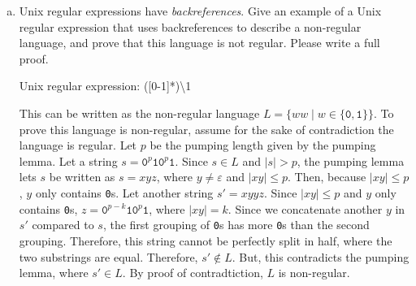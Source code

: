 \documentclass{article}
\begin{document}
\begin{enumerate}[(a)]
                Therefore, any regular expression with a quantifier can be rewritten without a quantifier.

            \item Unix regular expressions have \textit{backreferences}. Give an example of a Unix regular expression that uses backreferences to describe a non-regular language, and prove that this language is not regular. Please write a full proof.

                Unix regular expression: ([0-1]*)\textbackslash1

                This can be written as the non-regular language $L = \{ww \mid w \in \{\texttt{0}, \texttt{1}\}\}$. To prove this language is non-regular, assume for the sake of contradiction the language is regular. Let $p$ be the pumping length given by the pumping lemma. Let a string $s = \texttt{0}^p \texttt{10}^p \texttt{1}$. Since $s \in L$ and $|s| > p$, the pumping lemma lets $s$ be written as $s = xyz$, where $y \neq \varepsilon$ and $|xy| \le p$. Then, because $|xy| \le p$, $y$ only contains \texttt{0}s. Let another string $s' = xyyz$. Since $|xy| \le p$ and $y$ only contains \texttt{0}s, $z = \texttt{0}^{p-k}\texttt{10}^p\texttt{1}$, where $|xy| = k$. Since we concatenate another $y$ in $s'$ compared to $s$, the first grouping of \texttt{0}s has more \texttt{0}s than the second grouping. Therefore, this string cannot be perfectly split in half, where the two substrings are equal. Therefore, $s' \notin L$. But, this contradicts the pumping lemma, where $s' \in L$. By proof of contradtiction, $L$ is non-regular.

        \end{enumerate}
\end{document}
